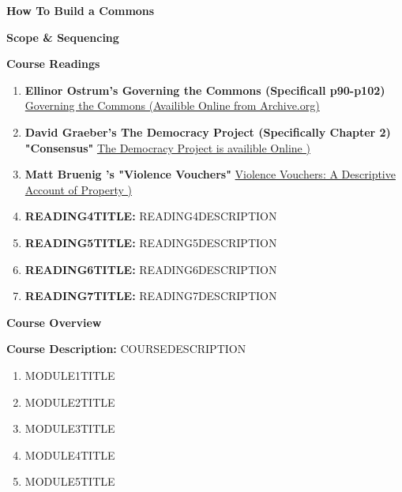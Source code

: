 \documentclass{article}
\begin{document}
	
{\huge \textbf{How To Build a Commons}}

\vspace{1cm}

{\Large \textbf{Scope \& Sequencing}}

\vspace{1cm}

{\huge \textbf{Course Readings}}

\begin{enumerate}
	
	\item \textbf{ Ellinor Ostrum's Governing the Commons (Specificall p90-p102) } \href{https://archive.org/details/governingthecommons}{Governing the Commons (Availible Online from Archive.org)}
	
	\item \textbf{David Graeber's The Democracy Project (Specifically Chapter 2)  "Consensus"} \href{https://theanarchistlibrary.org/library/david-graeber-the-democracy-project#toc21}{The Democracy Project is availible Online )}
	
	\item \textbf{Matt Bruenig 's "Violence Vouchers"} \href{	https://mattbruenig.com/2014/03/28/violence-vouchers-a-descriptive-account-of-property/}{Violence Vouchers: A Descriptive Account of Property )}
	
	\item \textbf{READING4TITLE:} READING4DESCRIPTION
	
	\item \textbf{READING5TITLE:} READING5DESCRIPTION
	
	\item \textbf{READING6TITLE:} READING6DESCRIPTION
	
	\item \textbf{READING7TITLE:} READING7DESCRIPTION
	
\end{enumerate}

\pagebreak

{\huge \textbf{Course Overview}}
\vspace{1cm}

\textbf{Course Description:} COURSEDESCRIPTION

\begin{enumerate}
\item MODULE1TITLE

\item MODULE2TITLE

\item MODULE3TITLE

\item MODULE4TITLE

\item MODULE5TITLE
\end{enumerate}
\end{document}
